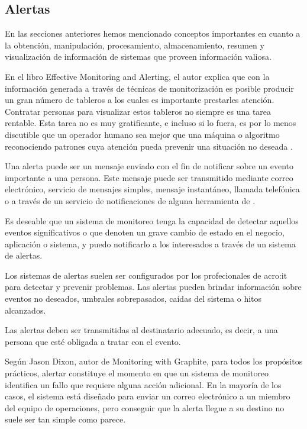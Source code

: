 \subsection{Alertas}
\label{alertas}

En las secciones anteriores hemos mencionado conceptos importantes en cuanto a
la obtención, manipulación, procesamiento, almacenamiento, resumen y
visualización de información de sistemas que proveen información valiosa.

En el libro Effective Monitoring and Alerting, el autor explica que con la
información generada a través de técnicas de monitorización es posible producir
un gran número de tableros a los cuales es importante prestarles atención.
Contratar personas para visualizar estos tableros no siempre es una tarea
rentable. Esta tarea no es muy gratificante, e incluso si lo fuera, es por lo
menos discutible que un operador humano sea mejor que una máquina o algoritmo
reconociendo patrones cuya atención pueda prevenir una situación no deseada
\cite[p. ~ 47]{monitoreo:efective_monitoring_and_alerting}.

Una alerta puede ser un mensaje enviado con el fin de notificar sobre un evento
importante a una persona. Este mensaje puede ser transmitido mediante correo
electrónico, servicio de mensajes simples, mensaje instantáneo, llamada
telefónica o a través de un servicio de notificaciones de alguna herramienta de
.

Es deseable que un sistema de monitoreo tenga la capacidad de detectar aquellos
eventos significativos o que denoten un grave cambio de estado en el negocio,
aplicación o sistema, y puedo notificarlo a los interesados a través de un
sistema de alertas.

Los sistemas de alertas suelen ser configurados por los profecionales de
\gls{acro:it} para detectar y prevenir problemas. Las alertas pueden brindar
información sobre eventos no deseados, umbrales sobrepasados, caídas del
sistema o hitos alcanzados.

Las alertas deben ser transmitidas al destinatario adecuado, es decir, a una
persona que esté obligada a tratar con el evento.

Según Jason Dixon, autor de Monitoring with Graphite, para todos los propósitos
prácticos, alertar constituye el momento en que un sistema de monitoreo
identifica un fallo que requiere alguna acción adicional. En la mayoría de los
casos, el sistema está diseñado para enviar un correo electrónico a un miembro
del equipo de operaciones, pero conseguir que la alerta llegue a su destino no
suele ser tan simple como parece.


